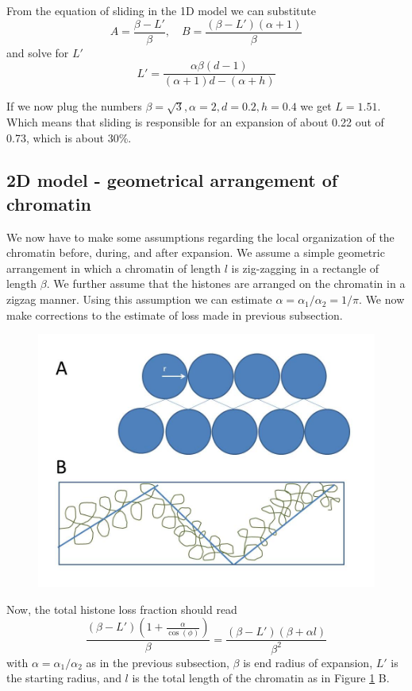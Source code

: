 \documentclass[12pt]{report}
\begin{document}
  From the equation of sliding in the 1D model we can substitute 
  \begin{equation*}
  A= \frac{\beta-L'}{\beta}, \quad B=\frac{(\beta -L')(\alpha+1)}{\beta}
  \end{equation*}
  and solve for $L'$ 
  \begin{equation*}
  L' = \frac{\alpha\beta(d-1)}{(\alpha+1)d -(\alpha+h)}
  \end{equation*}
  
  If we now plug the numbers $\beta=\sqrt{3}, \alpha =  2, d=0.2, h=0.4$ we get $L=1.51$. Which means that sliding is responsible for an expansion of about 0.22 out of 0.73, which is about 30\%.
 
\subsection{2D model - geometrical arrangement of chromatin}\label{subsection:2dModelGeometricalArrangement}
We now have to make some assumptions regarding the local organization of the chromatin before, during, and after expansion. 
We assume a simple geometric arrangement in which a chromatin of length $l$ is zig-zagging in a rectangle of length $\beta$.
We further assume that the histones are arranged on the chromatin in a zigzag manner. Using this assumption we can estimate $\alpha = \alpha_1/\alpha_2 = 1/\pi$. 
We now make corrections to the estimate of loss made in previous subsection. 

\begin{figure}[H]
\centering
\includegraphics[width=0.7\linewidth, height=0.3\textheight]{Images/SlidingModel/2Darrangement}
\caption{}
\label{fig:2Darrangement}
\end{figure}

Now, the total histone loss fraction should read 
\begin{equation*}
\frac{(\beta-L')(1+\frac{\alpha}{\cos(\phi)})}{\beta}=\frac{(\beta-L')(\beta+\alpha l)}{\beta^2}
\end{equation*}
with $\alpha = \alpha_1/\alpha_2$ as in the previous subsection, $\beta$ is end radius of expansion, $L'$ is the starting radius, and $l$ is the total length of the chromatin as in Figure \ref{fig:2Darrangement} B. 
 
\end{document}
